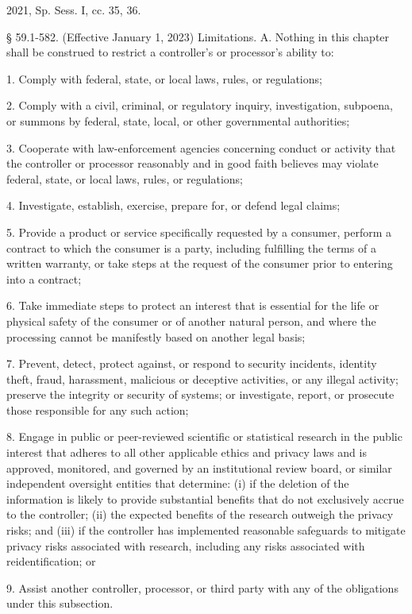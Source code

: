 2021, Sp. Sess. I, cc. 35, 36.

§ 59.1-582. (Effective January 1, 2023) Limitations.
A. Nothing in this chapter shall be construed to restrict a controller's or processor's ability to:

1. Comply with federal, state, or local laws, rules, or regulations;

2. Comply with a civil, criminal, or regulatory inquiry, investigation, subpoena, or summons by federal, state, local, or other governmental authorities;

3. Cooperate with law-enforcement agencies concerning conduct or activity that the controller or processor reasonably and in good faith believes may violate federal, state, or local laws, rules, or regulations;

4. Investigate, establish, exercise, prepare for, or defend legal claims;

5. Provide a product or service specifically requested by a consumer, perform a contract to which the consumer is a party, including fulfilling the terms of a written warranty, or take steps at the request of the consumer prior to entering into a contract;

6. Take immediate steps to protect an interest that is essential for the life or physical safety of the consumer or of another natural person, and where the processing cannot be manifestly based on another legal basis;

7. Prevent, detect, protect against, or respond to security incidents, identity theft, fraud, harassment, malicious or deceptive activities, or any illegal activity; preserve the integrity or security of systems; or investigate, report, or prosecute those responsible for any such action;

8. Engage in public or peer-reviewed scientific or statistical research in the public interest that adheres to all other applicable ethics and privacy laws and is approved, monitored, and governed by an institutional review board, or similar independent oversight entities that determine: (i) if the deletion of the information is likely to provide substantial benefits that do not exclusively accrue to the controller; (ii) the expected benefits of the research outweigh the privacy risks; and (iii) if the controller has implemented reasonable safeguards to mitigate privacy risks associated with research, including any risks associated with reidentification; or

9. Assist another controller, processor, or third party with any of the obligations under this subsection.

